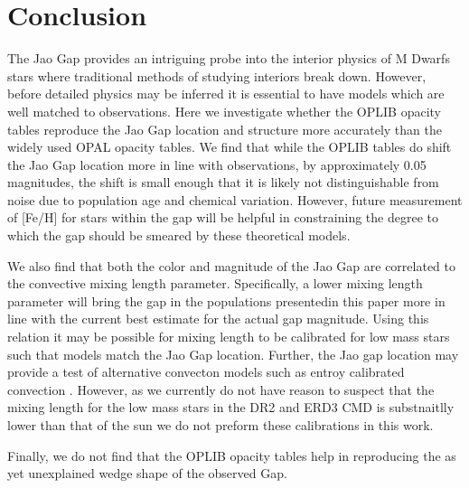 \section{Conclusion}\label{sec:conclusion}
%
%
The Jao Gap provides an intriguing probe into the interior physics of M Dwarfs
stars where traditional methods of studying interiors break down. However,
before detailed physics may be inferred it is essential to have models which
are well matched to observations. Here we investigate whether the OPLIB opacity
tables reproduce the Jao Gap location and structure more accurately than the
widely used OPAL opacity tables. We find that while the OPLIB tables do shift
the Jao Gap location more in line with observations, by approximately 0.05
magnitudes, the shift is small enough that it is likely not distinguishable
from noise due to population age and chemical variation. However, future
measurement of [Fe/H] for stars within the gap will be helpful in constraining
the degree to which the gap should be smeared by these theoretical models.

We also find that both the color and magnitude of the Jao Gap are correlated to
the convective mixing length parameter. Specifically, a lower mixing length
parameter will bring the gap in the populations presentedin this paper more in
line with the current best estimate for the actual gap magnitude. Using this
relation it may be possible for mixing length to be calibrated for low mass
stars such that models match the Jao Gap location. Further, the Jao gap
location may provide a test of alternative convecton models such as entroy
calibrated convection \citep{Spada2021}. However, as we currently do not have
reason to suspect that the mixing length for the low mass stars in the DR2 and
ERD3 CMD is substnaitlly lower than that of the sun we do not preform these
calibrations in this work.

Finally, we do not find that the OPLIB opacity tables help in reproducing the
as yet unexplained wedge shape of the observed Gap.
